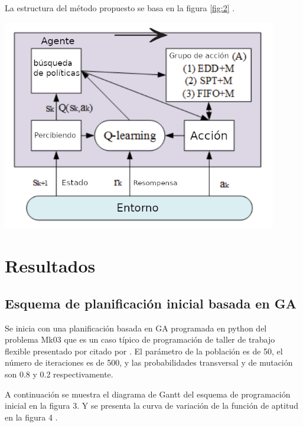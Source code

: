 \documentclass[letterpaper, 10 pt]{article}
\newenvironment{Figura}
{\par\medskip\noindent\minipage{\linewidth}}
{\endminipage\par\medskip}
\begin{document}
La estructura del método propuesto se basa en la figura \ref{fig:2} \citep{zhao2019improved}.
\begin{Figura}
	\centering
	\includegraphics[width=0.9\textwidth]{estructura.png}
	\label{fig:2}
\end{Figura}  
\section{Resultados}
\subsection{Esquema de planificación inicial basada en GA }
 Se inicia con una planificación basada en GA programada en python del problema Mk03 que es un caso típico de programación de taller de trabajo flexible presentado por \cite{brandimarte1993routing} citado por \cite{zhao2019improved}. El parámetro de la población es de 50, el número de iteraciones es de 500, y las probabilidades transversal y de mutación son 0.8 y 0.2 respectivamente.

A continuación se muestra el diagrama de Gantt del esquema de programación inicial
en la figura 3. Y se presenta la curva de variación de la función de aptitud en la figura 4 \citep{zhao2019improved}.
\end{document}
